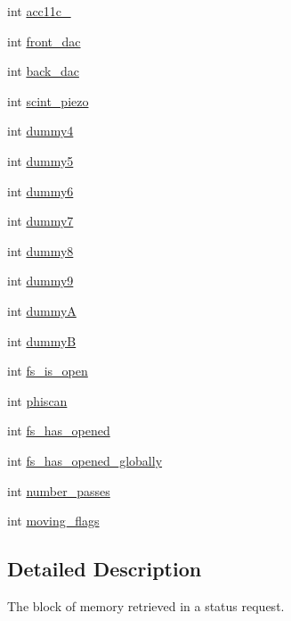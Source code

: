 \begin{DoxyCompactItemize}
\item 
int \hyperlink{structmd2StatusStruct_ac7029100738dcc3f09a8b0d1d3d1d353}{acc11c\_}
\item 
int \hyperlink{structmd2StatusStruct_a3be73c48b09190241a2bcb801af5b97c}{front\_\-dac}
\item 
int \hyperlink{structmd2StatusStruct_a33ce490348c8de255cf49b96469d3d4e}{back\_\-dac}
\item 
int \hyperlink{structmd2StatusStruct_a031be48adfa016c637d6eae49054c435}{scint\_\-piezo}
\item 
int \hyperlink{structmd2StatusStruct_adaa01db9cf77d95756bc3156fb702600}{dummy4}
\item 
int \hyperlink{structmd2StatusStruct_af4f8869f8954c6162cae80000c54694f}{dummy5}
\item 
int \hyperlink{structmd2StatusStruct_a864a2234ede061ec2380230ebf29ce70}{dummy6}
\item 
int \hyperlink{structmd2StatusStruct_a91f38d814222edeffa67a6a3ab61f5d6}{dummy7}
\item 
int \hyperlink{structmd2StatusStruct_a17f44367cfa4c66ec3ee481863ef4960}{dummy8}
\item 
int \hyperlink{structmd2StatusStruct_aa5aadda5a5cb98c6028f8b45e16cd084}{dummy9}
\item 
int \hyperlink{structmd2StatusStruct_a9fc7dc802d00c22463dd7ddd531e06d7}{dummyA}
\item 
int \hyperlink{structmd2StatusStruct_aab597be69a8dcc140778d9aeb8a50eee}{dummyB}
\item 
int \hyperlink{structmd2StatusStruct_aca3722c109e6646bd41fb269a32261f2}{fs\_\-is\_\-open}
\item 
int \hyperlink{structmd2StatusStruct_abe3d4a61a15f54590b061e23b45e659c}{phiscan}
\item 
int \hyperlink{structmd2StatusStruct_ab961c2ba24a1a8c95a88dec25319e712}{fs\_\-has\_\-opened}
\item 
int \hyperlink{structmd2StatusStruct_ac95696b7ed35ccfdfb6aeeee879bdb65}{fs\_\-has\_\-opened\_\-globally}
\item 
int \hyperlink{structmd2StatusStruct_ab3da523bad7b82c1d27780caa24a8b92}{number\_\-passes}
\item 
int \hyperlink{structmd2StatusStruct_aac82f8e97fa39ea9be7823dd1d308986}{moving\_\-flags}
\end{DoxyCompactItemize}


\subsection{Detailed Description}
The block of memory retrieved in a status request. 

